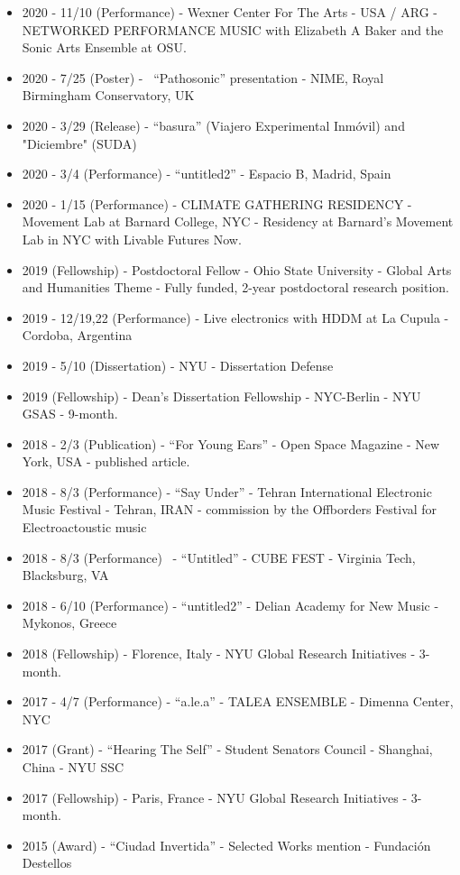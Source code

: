 \begin{itemize}
\item 2020 - 11/10 (Performance) - Wexner Center For The Arts - USA / ARG - NETWORKED PERFORMANCE MUSIC with Elizabeth A Baker and the Sonic Arts Ensemble at OSU.
\item 2020 - 7/25 (Poster) -  ``Pathosonic'' presentation - NIME, Royal Birmingham Conservatory, UK
\item 2020 - 3/29 (Release) - ``basura'' (Viajero Experimental Inmóvil) and "Diciembre" (SUDA)
\item 2020 - 3/4 (Performance) - ``untitled2'' - Espacio B, Madrid, Spain
\item 2020 - 1/15 (Performance) - CLIMATE GATHERING RESIDENCY - Movement Lab at Barnard College, NYC - Residency at Barnard's Movement Lab in NYC with Livable Futures Now.
\item 2019 (Fellowship) - Postdoctoral Fellow - Ohio State University - Global Arts and Humanities Theme - Fully funded, 2-year postdoctoral research position.
\item 2019 - 12/19,22 (Performance) - Live electronics with HDDM at La Cupula - Cordoba, Argentina 
\item 2019 - 5/10 (Dissertation) - NYU - Dissertation Defense
\item 2019 (Fellowship) - Dean's Dissertation Fellowship - NYC-Berlin - NYU GSAS - 9-month.
\item 2018 - 2/3 (Publication) - ``For Young Ears'' - Open Space Magazine - New York, USA - published article.
\item 2018 - 8/3 (Performance) - ``Say Under'' - Tehran International Electronic Music Festival - Tehran, IRAN - commission by the Offborders Festival for Electroactoustic music
\item 2018 - 8/3 (Performance)  - ``Untitled'' - CUBE FEST - Virginia Tech, Blacksburg, VA 
\item 2018 - 6/10 (Performance) - ``untitled2'' - Delian Academy for New Music - Mykonos, Greece
\item 2018 (Fellowship) - Florence, Italy - NYU Global Research Initiatives - 3-month.
\item 2017 - 4/7 (Performance) - ``a.le.a'' - TALEA ENSEMBLE - Dimenna Center, NYC
\item 2017 (Grant) - ``Hearing The Self'' - Student Senators Council - Shanghai, China - NYU SSC
\item 2017 (Fellowship) - Paris, France - NYU Global Research Initiatives - 3-month.
\item 2015 (Award) - ``Ciudad Invertida'' - Selected Works mention - Fundación Destellos 

\end{itemize}
